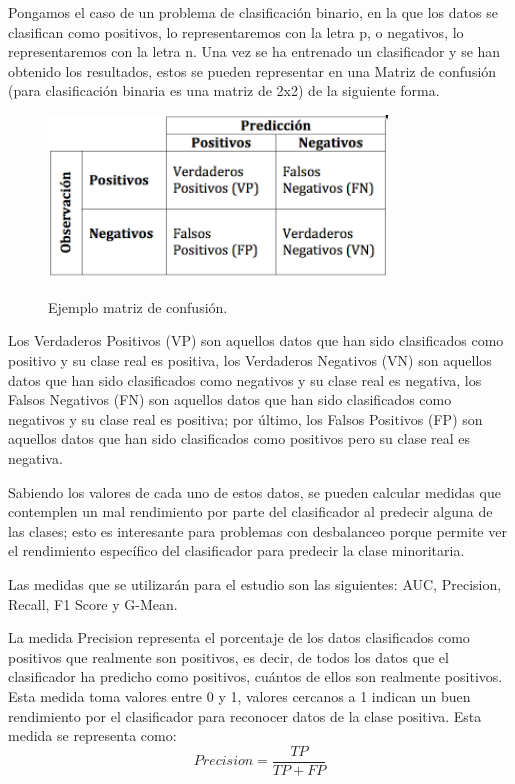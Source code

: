 Pongamos el caso de un problema de clasificación binario, en la que los datos se clasifican como positivos, lo representaremos con la letra p, o negativos, lo representaremos con la letra n. Una vez se ha entrenado un clasificador y se han obtenido los resultados, estos se pueden representar en una Matriz de confusión (para clasificación binaria es una matriz de 2x2) de la siguiente forma.\newline

\begin{figure}[h]
	\centering
	\includegraphics[width=90mm]{imagenes/conf-matrix.png}
	\label{fig:61}
	\caption{Ejemplo matriz de confusión.}
\end{figure}

Los Verdaderos Positivos (VP) son aquellos datos que han sido clasificados como positivo y su clase real es positiva, los Verdaderos Negativos (VN) son aquellos datos que han sido clasificados como negativos y su clase real es negativa, los Falsos Negativos (FN) son aquellos datos que han sido clasificados como negativos y su clase real es positiva; por último, los Falsos Positivos (FP) son aquellos datos que han sido clasificados como positivos pero su clase real es negativa.\newline

Sabiendo los valores de cada uno de estos datos, se pueden calcular medidas que contemplen un mal rendimiento por parte del clasificador al predecir alguna de las clases; esto es interesante para problemas con desbalanceo porque permite ver el rendimiento específico del clasificador para predecir la clase minoritaria.\newline

Las medidas que se utilizarán para el estudio son las siguientes: AUC, Precision, Recall, F1 Score y G-Mean.\newline

La medida Precision representa el porcentaje de los datos clasificados como positivos que realmente son positivos, es decir, de todos los datos que el clasificador ha predicho como positivos, cuántos de ellos son realmente positivos. Esta medida toma valores entre 0 y 1, valores cercanos a 1 indican un buen rendimiento por el clasificador para reconocer datos de la clase positiva. Esta medida se representa como:\newline
$$ Precision = \frac{TP}{TP + FP} $$

